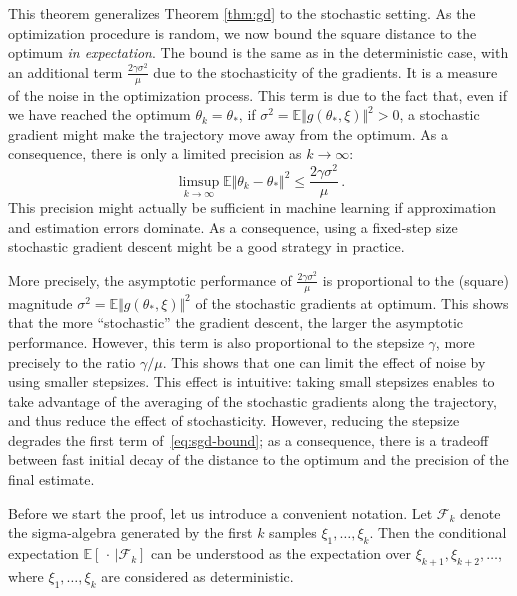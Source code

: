 \documentclass[11pt,reqno]{article}
\newcommand{\E}{\mathbb{E}}
\newcommand{\cF}{\mathcal{F}}
\renewcommand{\leq}{\leqslant}
\numberwithin{equation}{section}
\theoremstyle{plain}
\theoremstyle{definition}
\theoremstyle{remark}
\begin{document}
	This theorem generalizes Theorem \ref{thm:gd} to the stochastic setting. As the optimization procedure is random, we now bound the square distance to the optimum \emph{in expectation}. The bound is the same as in the deterministic case, with an additional term $\frac{2\gamma \sigma^2}{\mu}$ due to the stochasticity of the gradients. It is a measure of the noise in the optimization process. This term is due to the fact that, even if we have reached the optimum $\theta_k = \theta_*$, if $\sigma^2 = \E \Vert g(\theta_*, \xi) \Vert^2 >0$, a stochastic gradient might make the trajectory move away from the optimum. As a consequence, there is only a limited precision as $k \to \infty$:
	\begin{equation*}
		\limsup_{k \to \infty} \E \Vert \theta_k - \theta_* \Vert^2 \leq \frac{2\gamma \sigma^2}{\mu} \, .
	\end{equation*}
	This precision might actually be sufficient in machine learning if approximation and estimation errors dominate. As a consequence, using a fixed-step size stochastic gradient descent might be a good strategy in practice.

	More precisely, the asymptotic performance of $\frac{2\gamma \sigma^2}{\mu}$ is proportional to the (square) magnitude $\sigma^2 = \E \Vert g(\theta_*, \xi) \Vert^2 $ of the stochastic gradients at optimum. This shows that the more ``stochastic'' the gradient descent, the larger the asymptotic performance. However, this term is also proportional to the stepsize $\gamma$, more precisely to the ratio $\gamma / \mu$. This shows that one can limit the effect of noise by using smaller stepsizes. This effect is intuitive: taking small stepsizes enables to take advantage of the averaging of the stochastic gradients along the trajectory, and thus reduce the effect of stochasticity. However, reducing the stepsize degrades the first term of~\eqref{eq:sgd-bound}; as a consequence, there is a tradeoff between fast initial decay of the distance to the optimum and the precision of the final estimate.

Before we start the proof, let us introduce a convenient notation. Let $\cF_k$ denote the sigma-algebra generated by the first $k$ samples $\xi_1, \dots, \xi_k$. Then the conditional expectation $\E[\, \cdot \, | \cF_k]$ can be understood as the expectation over $\xi_{k+1}, \xi_{k+2}, \dots$, where $\xi_1, \dots, \xi_k$ are considered as deterministic.
\end{document}
